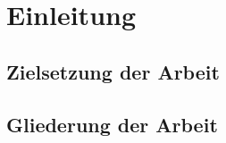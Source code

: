 
\chapter{Einleitung}
\label{ch:Einleitung}


\section{Zielsetzung der Arbeit}
\label{ch:Einleitung:sec:Zielsetzung}





\section{Gliederung der Arbeit}
\label{ch:Einleitung:sec:Gliederung}




